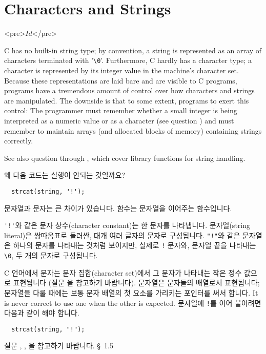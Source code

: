 \chapter{Characters and Strings}	\label{chap:charstr}

\begin{rawhtml}
<pre>$Id$</pre>
\end{rawhtml}

C has no built-in string type; by convention, a string is represented as an
array of characters terminated with '\verb+\0+'.  Furthermore, C hardly has
a character type; a character is represented by its integer value in the
machine's character set.  Because these representations are laid bare and are
visible to C programs, programs have a tremendous amount of control over how
characters and strings are manipulated.  The downside is that to some extent,
programs  to exert this control:  The programmer must remember
whether a small integer is being interpreted as a numeric value or as a
character (see question ) and must remember to maintain arrays (and
allocated blocks of memory) containing strings correctly.

See also question  through , which cover library functions for
string handling.

\begin{faq}
	왜 다음 코드는 실행이 안되는 것일까요?
\begin{verbatim}
  strcat(string, '!');
\end{verbatim}
\A	
	문자열과 문자는 큰 차이가 있습니다.   함수는 문자열을
	이어주는 함수입니다.
        
        \verb+'!'+와 같은 문자 상수(character constant)는 한 문자를 나타냅니다.
        문자열(string literal)은 쌍따옴표로 둘러싼, 대개 여러 글자의 문자로
        구성됩니다. \verb+"!"+와 같은 문자열은 하나의 문자를 나타내는 것처럼
        보이지만, 실제로 \verb+!+ 문자와, 문자열 끝을 나타내는 \verb+\0+, 두
        개의 문자로 구성됩니다.

	C 언어에서 문자는 문자 집합(character set)에서 그 문자가 나타내는
	작은 정수 값으로 표현됩니다 (질문 을 참고하기 바랍니다).
	문자열은 문자들의 배열로서 표현됩니다; 문자열을 다룰 때에는
	보통 문자 배열의 첫 요소를 가리키는 포인터를 써서 합니다.
        It is never correct to use one when the other is expected.
	문자열에 \verb+!+를 이어 붙이려면 다음과 같이 해야 합니다.
\begin{verbatim}
  strcat(string, "!");
\end{verbatim}

	질문 , , 을 참고하기 바랍니다.
\R
	\cite{ctp} \S\ 1.5 
\end{faq}


